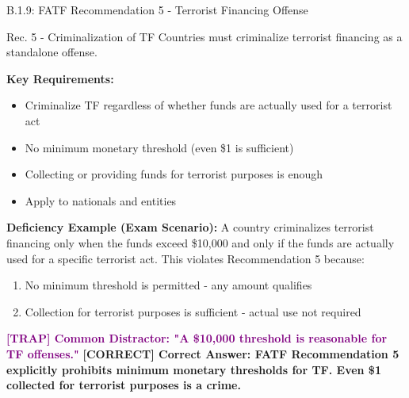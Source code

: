 \documentclass[11pt,a4paper]{beamer}
\newcommand{\trap}[1]{\textcolor{purple}{\textbf{[TRAP] #1}}}
\newcommand{\correct}[1]{\textcolor{green!50!black}{\textbf{[CORRECT] #1}}}
\begin{document}
	\begin{frame}{B.1.9: FATF Recommendation 5 - Terrorist Financing Offense}
		\begin{block}{Rec. 5 - Criminalization of TF}
			Countries must criminalize terrorist financing as a standalone offense.
		\end{block}
		\textbf{Key Requirements:}
		\begin{itemize}
			\item Criminalize TF regardless of whether funds are actually used for a terrorist act
			\item No minimum monetary threshold (even \$1 is sufficient)
			\item Collecting or providing funds for terrorist purposes is enough
			\item Apply to nationals and entities
		\end{itemize}
		\textbf{Deficiency Example (Exam Scenario):}
		A country criminalizes terrorist financing only when the funds exceed \$10,000 and only if the funds are actually used for a specific terrorist act. This violates Recommendation 5 because:
		\begin{enumerate}
			\item No minimum threshold is permitted - any amount qualifies
			\item Collection for terrorist purposes is sufficient - actual use not required
		\end{enumerate}
		
		\trap{Common Distractor: "A \$10,000 threshold is reasonable for TF offenses."}
		\correct{Correct Answer: FATF Recommendation 5 explicitly prohibits minimum monetary thresholds for TF. Even \$1 collected for terrorist purposes is a crime.}
	\end{frame}
	
\end{document}
